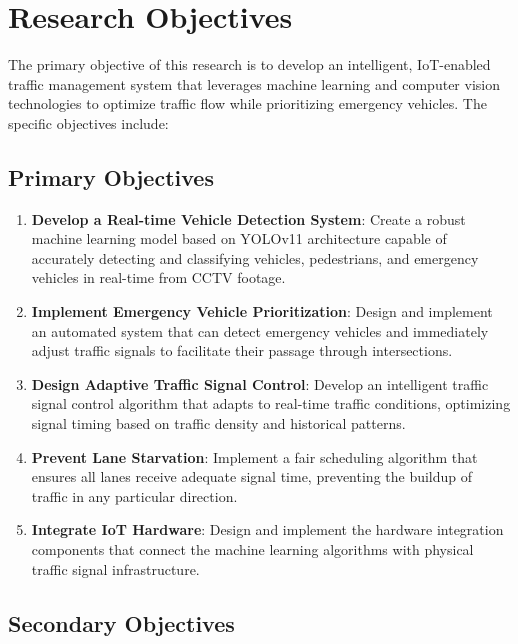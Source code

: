 \section{Research Objectives}

The primary objective of this research is to develop an intelligent, IoT-enabled traffic management system that leverages machine learning and computer vision technologies to optimize traffic flow while prioritizing emergency vehicles. The specific objectives include:

\subsection{Primary Objectives}

\begin{enumerate}
    \item \textbf{Develop a Real-time Vehicle Detection System}: Create a robust machine learning model based on YOLOv11 architecture capable of accurately detecting and classifying vehicles, pedestrians, and emergency vehicles in real-time from CCTV footage.
    
    \item \textbf{Implement Emergency Vehicle Prioritization}: Design and implement an automated system that can detect emergency vehicles and immediately adjust traffic signals to facilitate their passage through intersections.
    
    \item \textbf{Design Adaptive Traffic Signal Control}: Develop an intelligent traffic signal control algorithm that adapts to real-time traffic conditions, optimizing signal timing based on traffic density and historical patterns.
    
    \item \textbf{Prevent Lane Starvation}: Implement a fair scheduling algorithm that ensures all lanes receive adequate signal time, preventing the buildup of traffic in any particular direction.
    
    \item \textbf{Integrate IoT Hardware}: Design and implement the hardware integration components that connect the machine learning algorithms with physical traffic signal infrastructure.
\end{enumerate}

\subsection{Secondary Objectives}

